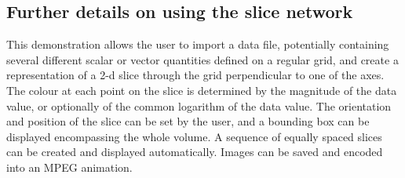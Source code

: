 \subsection{\label{slice}Further details on using the {\bf slice} network}
This demonstration allows the user to import a data file, potentially
containing several different scalar or vector quantities defined on a
regular grid, and create a representation of a 2-d slice
through the grid perpendicular to one of the axes. The colour at each
point on the slice is determined by the magnitude of the data value, or
optionally of the common logarithm of the data value. The orientation
and position of the slice can be set by the user, and a bounding box can
be displayed encompassing the whole volume. A sequence of equally spaced
slices can be created and displayed automatically. Images can be saved
and encoded into an MPEG animation.

